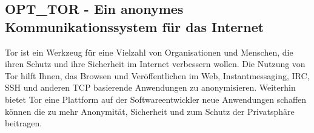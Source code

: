 \subsection{OPT\_TOR - Ein anonymes Kommunikationssystem für das Internet}

Tor ist ein Werkzeug für eine Vielzahl von Organisationen und
Menschen, die ihren Schutz und ihre Sicherheit im Internet verbessern
wollen. Die Nutzung von Tor hilft Ihnen, das Browsen und
Veröffentlichen im Web, Instantmessaging, IRC, SSH und anderen TCP
basierende Anwendungen zu anonymisieren. Weiterhin bietet Tor eine
Plattform auf der Softwareentwickler neue Anwendungen schaffen können
die zu mehr Anonymität, Sicherheit und zum Schutz der Privatsphäre
beitragen.


